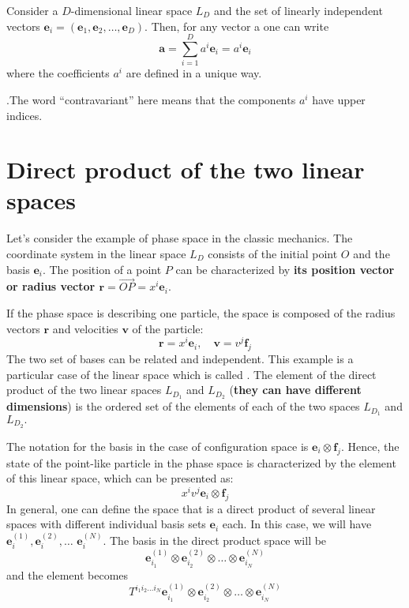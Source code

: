 \begin{thm}
Consider a $D$-dimensional linear space $L_{D}$ and the set of linearly independent vectors $\mathbf{e}_{i}=\left(\mathbf{e}_{1}, \mathbf{e}_{2}, \ldots, \mathbf{e}_{D}\right) .$ Then, for any vector a one can write
\begin{equation}
    \mathbf{a}=\sum_{i=1}^{D} a^{i} \mathbf{e}_{i}=a^{i} \mathbf{e}_{i}
    \label{vector-basis}
\end{equation}
where the coefficients $a^{i}$ are defined in a unique way.
\end{thm}
.The word “contravariant” here means that the components $a^i$ have upper indices.

\section{Direct product of the two linear spaces}
Let's consider the example of phase space in the classic mechanics. The coordinate system in the linear space $L_{D}$ consists of the initial point $O$ and the basis $\mathbf{e}_{i} .$ The position of a point $P$ can be characterized by \textbf{its position vector or radius vector $\mathbf{r}=\overrightarrow{O P}=x^{i} \mathbf{e}_{i}$}.

If the phase space is describing one particle, the space is composed of the radius vectors $\mathbf{r}$ and velocities $\mathbf{v}$ of the particle:
$$
\mathbf{r}=x^{i} \mathbf{e}_{i}, \quad \mathbf{v}=v^{j} \mathbf{f}_{j}
$$
The two set of bases can be related and independent. This example is a particular case of the linear space which is called . The element of the direct product of the two linear spaces $L_{D_{1}}$ and $L_{D_{2}}$ (\textbf{they can have different dimensions}) is the ordered set of the elements of each of the two spaces $L_{D_{1}}$ and $L_{D_{2}} .$
\begin{qt}
    The notation for the basis in the case of configuration space is $\mathbf{e}_{i} \otimes \mathbf{f}_{j}$. Hence, the state of the point-like particle in the phase space is characterized by the element of this linear space, which can be presented as:
    $$
x^{i} v^{j} \mathbf{e}_{i} \otimes \mathbf{f}_{j}
$$
In general, one can define the space that is a direct product of several linear spaces with different individual basis sets $\mathbf{e}_{i}$ each. In this case, we will have $\mathbf{e}_{i}^{(1)}, \mathbf{e}_{i}^{(2)}, \ldots$ $\mathbf{e}_{i}^{(N)} .$ The basis in the direct product space will be
$$
\mathbf{e}_{i_{1}}^{(1)} \otimes \mathbf{e}_{i_{2}}^{(2)} \otimes \ldots \otimes \mathbf{e}_{i_{N}}^{(N)}
$$
and the element becomes
$$
T^{i_{1} i_{2} \ldots i_{N}} \mathbf{e}_{i_{1}}^{(1)} \otimes \mathbf{e}_{i_{2}}^{(2)} \otimes \ldots \otimes \mathbf{e}_{i_{N}}^{(N)}
$$
\end{qt}
